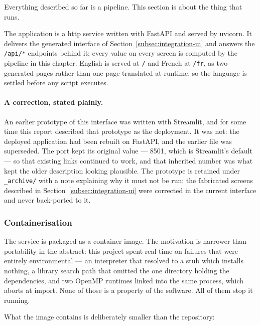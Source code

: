 Everything described so far is a pipeline. This section is about the thing that runs.

The application is a \gls{http} service written with FastAPI and served by uvicorn. It
delivers the generated interface of Section~\ref{subsec:integration-ui} and answers the
\texttt{/api/*} endpoints behind it; every value on every screen is computed by the pipeline
in this chapter. English is served at \texttt{/} and French at \texttt{/fr}, as two generated
pages rather than one page translated at runtime, so the language is settled before any script
executes.

\paragraph{A correction, stated plainly.} An earlier prototype of this interface was written
with Streamlit, and for some time this report described that prototype as the deployment. It
was not: the deployed application had been rebuilt on FastAPI, and the earlier file was
superseded. The port kept its original value --- 8501, which is Streamlit's default --- so
that existing links continued to work, and that inherited number was what kept the older
description looking plausible. The prototype is retained under \texttt{\_archive/} with a note
explaining why it must not be run: the fabricated screens described in
Section~\ref{subsec:integration-ui} were corrected in the current interface and never
back-ported to it.

\subsubsection{Containerisation}

The service is packaged as a container image. The motivation is narrower than portability in
the abstract: this project spent real time on failures that were entirely environmental --- an
interpreter that resolved to a stub which installs nothing, a library search path that omitted
the one directory holding the dependencies, and two OpenMP runtimes linked into the same
process, which aborts at import. None of those is a property of the software. All of them stop
it running.

What the image contains is deliberately smaller than the repository:

